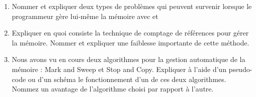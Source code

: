 \begin{Exercise}

\begin{enumerate}

\item Nommer et expliquer deux types de problèmes qui peuvent survenir
  lorsque le programmeur gère lui-même la mémoire avec
   et 

\item Expliquer en quoi consiste la technique de comptage de références pour
gérer la mémoire. Nommer et expliquer une faiblesse importante de
cette méthode.

\item Nous avons vu en cours deux algorithmes pour la gestion automatique de
la mémoire : Mark and Sweep et Stop and Copy. Expliquer à l'aide d'un
pseudo-code ou d'un schéma le fonctionnement d'un de ces deux
algorithmes. Nommez un avantage de l'algorithme choisi par rapport à
l'autre.

\end{enumerate}

\end{Exercise}